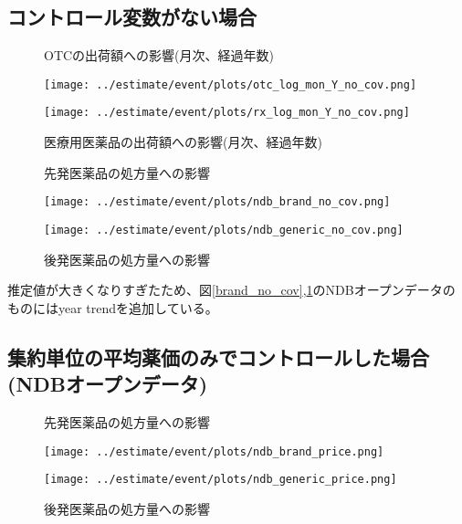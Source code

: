 \documentclass[a4paper,11pt,uplatex]{jsarticle}
\theoremstyle{definition}
\begin{document}
\begin{appendices}
    \subsection{コントロール変数がない場合}
    \begin{figure}[H]
        \centering
        \begin{minipage}{0.45\textwidth}
            \caption{OTCの出荷額への影響(月次、経過年数)}
            \centering
            \texttt{[image: ../estimate/event/plots/otc\_log\_mon\_Y\_no\_cov.png]}
        \end{minipage}\hfill
        \begin{minipage}{0.45\textwidth}
            \caption{医療用医薬品の出荷額への影響(月次、経過年数)}
            \centering
            \texttt{[image: ../estimate/event/plots/rx\_log\_mon\_Y\_no\_cov.png]}
        \end{minipage}
    \end{figure}
    \begin{figure}[H]
        \centering
        \begin{minipage}{0.45\textwidth}
            \caption{先発医薬品の処方量への影響}\label{brand_no_cov}
            \centering 
            \texttt{[image: ../estimate/event/plots/ndb\_brand\_no\_cov.png]}
        \end{minipage}\hfill
        \begin{minipage}{0.45\textwidth}
            \caption{後発医薬品の処方量への影響}\label{generic_no_cov}
            \centering
            \texttt{[image: ../estimate/event/plots/ndb\_generic\_no\_cov.png]}
        \end{minipage}
    \end{figure}
    推定値が大きくなりすぎたため、図\ref{brand_no_cov},\ref{generic_no_cov}のNDBオープンデータのものにはyear trendを追加している。
    \subsection{集約単位の平均薬価のみでコントロールした場合(NDBオープンデータ)}
    \begin{figure}[H]
        \centering
        \begin{minipage}{0.45\textwidth}
            \caption{先発医薬品の処方量への影響}
            \centering
            \texttt{[image: ../estimate/event/plots/ndb\_brand\_price.png]}
        \end{minipage}\hfill
        \begin{minipage}{0.45\textwidth}
            \caption{後発医薬品の処方量への影響}
            \centering
            \texttt{[image: ../estimate/event/plots/ndb\_generic\_price.png]}
        \end{minipage}
    \end{figure}

\end{appendices}
\end{document}
